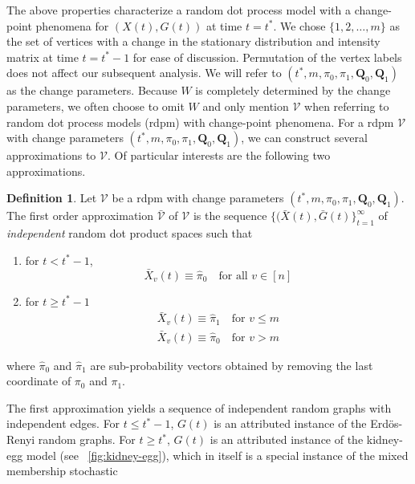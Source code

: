 \documentclass[10pt,journal,compsoc]{IEEEtran}
\theoremstyle{definition}
\newtheorem{definition}{Definition}
\begin{document}
The above properties characterize a random dot process model with a
change-point phenomena for $(X(t),G(t))$ at time $t = t^{*}$. We chose $\{1,2,\dots,m\}$
as the set of vertices with a change in the stationary distribution
and intensity matrix at time $t = t^{*} - 1$ for ease of
discussion. Permutation of the vertex labels does not affect our
subsequent analysis. We will refer to $(t^{*}, m, \pi_0, \pi_1,
\mathbf{Q}_0, \mathbf{Q}_1)$ as the change parameters.  Because $W$ is
completely determined by the change parameters, we often choose to
omit $W$ and only mention $\mathscr{V}$ when referring to random dot
process models (rdpm) with change-point phenomena. For a rdpm
$\mathscr{V}$ with change parameters $(t^{*}, m, \pi_0, \pi_1,
\mathbf{Q}_0, \mathbf{Q}_1)$, we can construct several approximations
to $\mathscr{V}$. Of particular interests are the following two
approximations.
\begin{definition}
  \label{def:1}
  Let $\mathscr{V}$ be a rdpm with change parameters $(t^{*}, m,
  \pi_0, \pi_1, \mathbf{Q}_0, \mathbf{Q}_1)$. The first order approximation
  $\bar{\mathscr{V}}$ of $\mathscr{V}$ is the sequence $\{(\bar{X}(t),
  \bar{G}(t)\}_{t = 1}^{\infty}$ of {\em independent} random dot product
  spaces such that
 \begin{enumerate}
 \item for $t < t^{*} - 1$,
   \begin{equation}
     \label{eq:5}
     \bar{X}_{v}(t)  \equiv \hat{\pi}_0 \quad \text{for all $v \in [n]$}
   \end{equation}
 \item for $t \geq t^{*} - 1$
   \begin{gather*}
     \bar{X}_{v}(t) \equiv \hat{\pi}_1 \quad \text{for $v \leq m$} \\
     \bar{X}_{v}(t) \equiv \hat{\pi}_0 \quad \text{for $v > m$} 
   \end{gather*}
 \end{enumerate}
 where $\hat{\pi}_0$ and $\hat{\pi}_1$ are sub-probability vectors
 obtained by removing the last coordinate of $\pi_0$ and $\pi_1$. 
\end{definition}
The first approximation yields a sequence of independent random graphs
with independent edges. For $t \leq t^{*} - 1$, $G(t)$ is an
attributed instance of the Erd\"{o}s-Renyi random graphs. For $t \geq
t^{*}$, $G(t)$ is an attributed instance of the kidney-egg model
\cite{rukhin11} (see \figurename~\ref{fig:kidney-egg}), which in
itself is a special instance of the mixed membership stochastic
\end{document}
